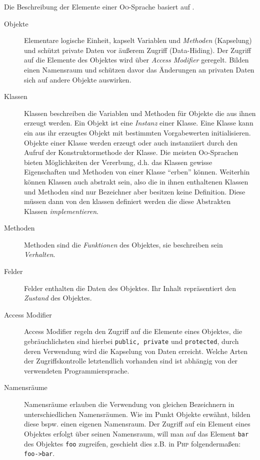 Die Beschreibung der Elemente einer \textsc{Oo}-Sprache basiert auf \cite{oopSkript2012}.

\begin{description}
    \item[Objekte] 
        Elementare logische Einheit, kapselt Variablen und \emph{Methoden} (Kapselung) und schützt private Daten vor äußerem Zugriff (Data-Hiding). Der Zugriff auf die Elemente des Objektes wird über \emph{Access Modifier} geregelt. Bilden einen Namensraum und schützen davor das Änderungen an privaten Daten sich auf andere Objekte auswirken.
    \item[Klassen] 
        Klassen beschreiben die Variablen und Methoden für Objekte die aus ihnen erzeugt werden. Ein Objekt ist eine \emph{Instanz} einer Klasse. Eine Klasse kann ein aus ihr erzeugtes Objekt mit bestimmten Vorgabewerten initialisieren. Objekte einer Klasse werden erzeugt oder auch instanziiert durch den Aufruf der Konstruktormethode der Klasse.
        Die meisten \textsc{Oo}-Sprachen bieten Möglichkeiten der Vererbung, d.h. das Klassen gewisse Eigenschaften und Methoden von einer Klasse \enquote{erben} können. Weiterhin können Klassen auch abstrakt sein, also die in ihnen enthaltenen Klassen und Methoden sind nur Bezeichner aber besitzen keine Definition. Diese müssen dann von den klassen definiert werden die diese Abstrakten Klassen \emph{implementieren}.
    \item[Methoden]
        Methoden sind die \emph{Funktionen} des Objektes, sie beschreiben sein \emph{Verhalten}.
    \item[Felder]
        Felder enthalten die Daten des Objektes. Ihr Inhalt repräsentiert den \emph{Zustand} des Objektes.
    \item[Access Modifier]    
        Access Modifier regeln den Zugriff auf die Elemente eines Objektes, die gebräuchlichsten sind hierbei \texttt{public, private} und \texttt{protected}, durch deren Verwendung wird die Kapselung von Daten erreicht. Welche Arten der Zugriffskontrolle letztendlich vorhanden sind ist abhängig von der verwendeten Programmiersprache.
    \item[Namensräume]
        Namensräume erlauben die Verwendung von gleichen Bezeichnern in unterschiedlichen Namensräumen. Wie im Punkt Objekte erwähnt, bilden diese bspw. einen eigenen Namensraum. Der Zugriff auf ein Element eines Objektes erfolgt über seinen Namensraum, will man auf das Element \texttt{bar} des Objektes \texttt{foo} zugreifen, geschieht dies z.B. in \textsc{Php} folgendermaßen: \texttt{foo->bar}.
\end{description}

